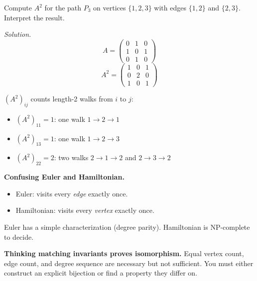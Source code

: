 \begin{example}
Compute $A^2$ for the path $P_3$ on vertices $\{1, 2, 3\}$ with edges $\{1,2\}$ and $\{2,3\}$. Interpret the result.

\emph{Solution.}
\[
A = \begin{pmatrix} 0 & 1 & 0 \\ 1 & 0 & 1 \\ 0 & 1 & 0 \end{pmatrix}
\]
\[
A^2 = \begin{pmatrix} 1 & 0 & 1 \\ 0 & 2 & 0 \\ 1 & 0 & 1 \end{pmatrix}
\]

$(A^2)_{ij}$ counts length-2 walks from $i$ to $j$:
\begin{itemize}
  \item $(A^2)_{11} = 1$: one walk $1 \to 2 \to 1$
  \item $(A^2)_{13} = 1$: one walk $1 \to 2 \to 3$
  \item $(A^2)_{22} = 2$: two walks $2 \to 1 \to 2$ and $2 \to 3 \to 2$
\end{itemize}
\end{example}

\begin{commonmistake}
\textbf{Confusing Euler and Hamiltonian.}
\begin{itemize}
  \item Euler: visits every \emph{edge} exactly once.
  \item Hamiltonian: visits every \emph{vertex} exactly once.
\end{itemize}
Euler has a simple characterization (degree parity). Hamiltonian is NP-complete to decide.
\end{commonmistake}

\begin{commonmistake}
\textbf{Thinking matching invariants proves isomorphism.} Equal vertex count, edge count, and degree sequence are necessary but not sufficient. You must either construct an explicit bijection or find a property they differ on.
\end{commonmistake}

